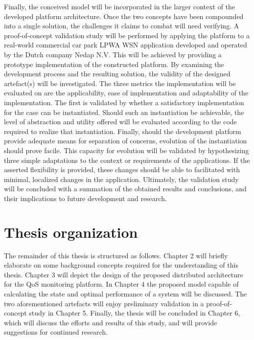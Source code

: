 Finally, the conceived model will be incorporated in the larger context of the developed platform architecture. Once the two concepts have been compounded into a single solution, the challenges it claims to combat will need verifying. A proof-of-concept validation study will be performed by applying the platform to a real-world commercial car park LPWA WSN application developed and operated by the Dutch company Nedap N.V. This will be achieved by providing a prototype implementation of the constructed platform. By examining the development process and the resulting solution, the validity of the designed artefact(s) will be investigated. The three metrics the implementation will be evaluated on are the applicability, ease of implementation and adaptability of the implementation. The first is validated by whether a satisfactory implementation for the case can be instantiated. Should such an instantiation be achievable, the level of abstraction and utility offered will be evaluated according to the code required to realize that instantiation. Finally, should the development platform provide adequate means for separation of concerns, evolution of the instantiation should prove facile. This capacity for evolution will be validated by hypothesizing three simple adaptations to the context or requirements of the applications. If the asserted flexibility is provided, these changes should be able to facilitated with minimal, localized changes in the application. Ultimately, the validation study will be concluded with a summation of the obtained results and conclusions, and their implications to future development and research.

\section{Thesis organization}
The remainder of this thesis is structured as follows. Chapter 2 will briefly elaborate on some background concepts required for the understanding of this thesis. Chapter 3 will depict the design of the proposed distributed architecture for the QoS monitoring platform. In Chapter 4 the proposed model capable of calculating the state and optimal performance of a system will be discussed. The two aforementioned artefacts will enjoy preliminary validation in a proof-of-concept study in Chapter 5. Finally, the thesis will be concluded in Chapter 6, which will discuss the efforts and results of this study, and will provide suggestions for continued research.
